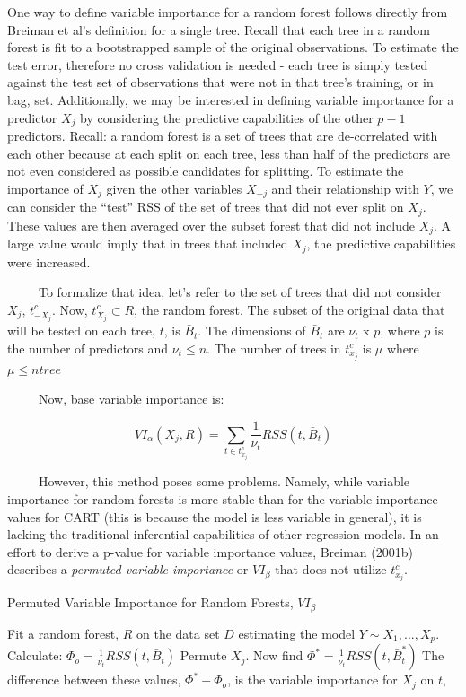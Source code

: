 \documentclass[12pt,twoside]{reedthesis}
\begin{document}
  One way to define variable importance for a random forest follows
  directly from Breiman et al's definition for a single tree. Recall that
  each tree in a random forest is fit to a bootstrapped sample of the
  original observations. To estimate the test error, therefore no cross
  validation is needed - each tree is simply tested against the test set
  of observations that were not in that tree's training, or in bag, set.
  Additionally, we may be interested in defining variable importance for a
  predictor \(X_j\) by considering the predictive capabilities of the
  other \(p-1\) predictors. Recall: a random forest is a set of trees that
  are de-correlated with each other because at each split on each tree,
  less than half of the predictors are not even considered as possible
  candidates for splitting. To estimate the importance of \(X_j\) given
  the other variables \(X_{-j}\) and their relationship with \(Y\), we can
  consider the ``test'' RSS of the set of trees that did not ever split on
  \(X_j\). These values are then averaged over the subset forest that did
  not include \(X_j\). A large value would imply that in trees that
  included \(X_j\), the predictive capabilities were increased.
  
  ~~~~~To formalize that idea, let's refer to the set of trees that did
  not consider \(X_j\), \(t_{-X_j}^c\). Now, \(t_{X_j}^c \subset R\), the
  random forest. The subset of the original data that will be tested on
  each tree, \(t\), is \(\bar{B}_t\). The dimensions of \(\bar{B}_t\) are
  \(\nu_t\) x \(p\), where \(p\) is the number of predictors and
  \(\nu_t \leq n\). The number of trees in \(t_{x_j}^c\) is \(\mu\) where
  \(\mu \leq ntree\)
  
  ~~~~~Now, base variable importance is:
  
  \[VI_{\alpha}(X_j, R) =  \sum_{t \in t_{x_j}^c} \frac 1 {\nu_t} RSS(t,\bar{B}_t)\]
  
  ~~~~~However, this method poses some problems. Namely, while variable
  importance for random forests is more stable than for the variable
  importance values for CART (this is because the model is less variable
  in general), it is lacking the traditional inferential capabilities of
  other regression models. In an effort to derive a p-value for variable
  importance values, Breiman (2001b) describes a \emph{permuted variable
  importance} or \(VI_{\beta}\) that does not utilize \(t_{x_j}^c\).
  
  \begin{algorithm}
  \caption{Permuted Variable Importance for Random Forests, $VI_{\beta}$}
  \label{breiman}
  \begin{algorithmic}
  \State Fit a random forest, $R$ on the data set $D$ estimating the model $Y \sim X_1,...,X_p$.
  \State Calculate: $\Phi_o =  \frac 1 {\nu_t} RSS(t,\bar{B}_t)$
  \State Permute $X_j$. Now find $\Phi^* =  \frac 1 {\nu_t} RSS(t,\bar{B}_t^*)$
  \State The difference between these values, $\Phi^* - \Phi_o$,  is the variable importance for $X_j$ on $t$,  
  \EndFor
  \EndFor
  \end{algorithmic}
  \end{algorithm}
  
\end{document}
